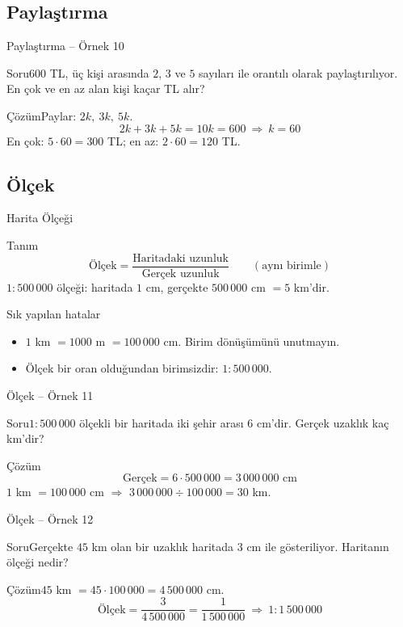 \documentclass[aspectratio=169,11pt,handout]{beamer}
\newcommand{\soru}[3]{%
\begin{frame}{#1}
  \begin{block}{Soru}\large #2\end{block}
  \pause
  \begin{exampleblock}{Çözüm}\large #3\end{exampleblock}
\end{frame}}
\begin{document}
\subsection{Paylaştırma}
\soru{Paylaştırma -- Örnek 10}
{\(600\) TL, üç kişi arasında \(2\), \(3\) ve \(5\) sayıları ile orantılı olarak paylaştırılıyor. En çok ve en az alan kişi kaçar TL alır?}
{Paylar: \(2k,\ 3k,\ 5k\).
\[2k+3k+5k=10k=600\ \Rightarrow\ k=60\]
En çok: \(5\cdot 60=300\) TL; \quad en az: \(2\cdot 60=120\) TL.}

\subsection{Ölçek}
\begin{frame}{Harita Ölçeği}
\begin{block}{Tanım}
\[\text{Ölçek}=\frac{\text{Haritadaki uzunluk}}{\text{Gerçek uzunluk}}\qquad(\text{aynı birimle})\]
\(1:500\,000\) ölçeği: haritada \(1\) cm, gerçekte \(500\,000\) cm \(=5\) km'dir.
\end{block}
\begin{alertblock}{Sık yapılan hatalar}
\begin{itemize}
\item \(1\) km \(=1000\) m \(=100\,000\) cm. Birim dönüşümünü unutmayın.
\item Ölçek bir oran olduğundan birimsizdir: \(1:500\,000\).
\end{itemize}
\end{alertblock}
\end{frame}

\soru{Ölçek -- Örnek 11}
{\(1:500\,000\) ölçekli bir haritada iki şehir arası \(6\) cm'dir. Gerçek uzaklık kaç km'dir?}
{\[\text{Gerçek}=6\cdot 500\,000=3\,000\,000\text{ cm}\]
\(1\) km \(=100\,000\) cm \(\Rightarrow\) \(3\,000\,000\div 100\,000=30\) km.}

\soru{Ölçek -- Örnek 12}
{Gerçekte \(45\) km olan bir uzaklık haritada \(3\) cm ile gösteriliyor. Haritanın ölçeği nedir?}
{\(45\) km \(=45\cdot 100\,000=4\,500\,000\) cm.
\[\text{Ölçek}=\frac{3}{4\,500\,000}=\frac{1}{1\,500\,000}\ \Rightarrow\ 1:1\,500\,000\]}
\end{document}
